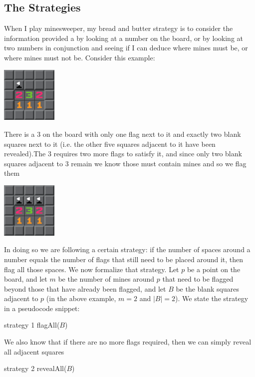 \documentclass{article}
\theoremstyle{definition}
\theoremstyle{definition}
\theoremstyle{theorem}
\begin{document}
	\subsection{The Strategies}
	When I play minesweeper, my bread and butter strategy is to consider the information provided a by looking at a number on the board, or by looking at two numbers in conjunction and seeing if I can deduce where mines must be, or where mines must not be. Consider this example:
	\begin{center}
		\includegraphics[width=0.2\textwidth]{exampleimages/example1a}
	\end{center}
	 There is a 3 on the board with only one flag next to it and exactly two blank squares next to it (i.e. the other five squares adjacent to it have been revealed).The 3 requires two more flags to satisfy it, and since only two blank squares adjacent to 3 remain we know those must contain mines and so we flag them
	\begin{center}
		\includegraphics[width=0.2\textwidth]{exampleimages/example1b}
	\end{center}
	In doing so we are following a certain strategy: if the number of spaces around a number equals the number of flags that still need to be placed around it, then flag all those spaces. We now formalize that strategy. Let $p$ be a point on the board, and let $m$ be the number of mines around $p$ that need to be flagged beyond those that have already been flagged, and let $B$ be the blank squares adjacent to $p$ (in the above example, $m = 2$ and $|B| = 2$). We state the strategy in a pseudocode snippet:
	\begin{algorithmic}
		 \Comment strategy 1
		\State flagAll($B$)
		\EndIf
	\end{algorithmic}
	We also know that if there are no more flags required, then we can simply reveal all adjacent squares
	\begin{algorithmic}
		 \Comment strategy 2
		\State revealAll($B$)
		\EndIf
	\end{algorithmic}
	
\end{document}
